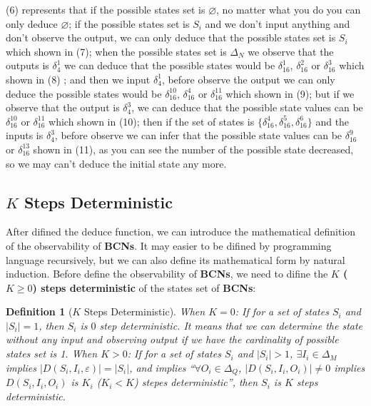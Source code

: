 \documentclass[letterpaper, 10 pt, conference]{ieeeconf}  %
\newtheorem{definition}{Definition}
\begin{document}
(6) represents that if the possible states set is $\varnothing$, no matter what you do you can only deduce $\varnothing$; if the possible states set is $S_i$ and we don't input anything and don't observe the output, we can only deduce that the possible states set is $S_i$ which shown in (7); when the possible states set is $\Delta_N$ we observe that the outputs is $\delta_4^1$ we can deduce that the possible states would be $\delta_{16}^1$, $\delta_{16}^2$ or  $\delta_{16}^3$ which shown in (8) ; and then we input $\delta_4^1$, before observe the output we can only deduce the possible states would be   $\delta_{16}^{10}$, $\delta_{16}^4$ or  $\delta_{16}^{11}$ which shown in (9); but if we observe that the output is $\delta_4^3$, we can deduce that the possible state values can be $\delta_{16}^{10}$ or  $\delta_{16}^{11}$ which shown in (10); then if the set of states is $\{\delta_{16}^4,\delta_{16}^5,\delta_{16}^6\}$ and the inputs is $\delta_4^3$, before observe we can infer that the possible state values can be $\delta_{16}^9$ or  $\delta_{16}^{13}$ shown in (11), as you can see the number of the possible state decreased, so we may can't deduce the initial state any more. 

\subsection{$K$ Steps Deterministic}
After difined the deduce function, we can introduce the mathematical definition of the observability of {\bf BCNs}. It may easier to be difined by programming language recursively, but we can also define its mathematical form by natural induction. Before define the observability of {\bf BCNs}, we need to difine the  {\bf  $K$ ($K\ge0$) steps deterministic} of the states set of {\bf BCNs}:\\
\begin{definition}[$K$ Steps Deterministic] 
When $K=0$:
 If for a set of states $S_i$ and $|S_i|=1$, then $S_i$ is $0$ step deterministic. It means that we can determine the state without any input and observing output if we have the cardinality of possible states set is 1. When $K>0$:
 If for a set of states $S_i$ and $|S_i|>1$, $\exists I_i \in \Delta_M$ implies $|D\left(S_i,I_i,\varepsilon\right)|=|S_i|$, and implies ``$\forall O_i\in \Delta_Q$, $|D\left(S_i,I_i,O_i\right)|\neq 0$ implies $D\left(S_i,I_i,O_i\right)$ is $K_i$ ($K_i<K$) stepes deterministic'', then $S_i$ is $K$ steps deterministic.
\end{definition}
\end{document}
